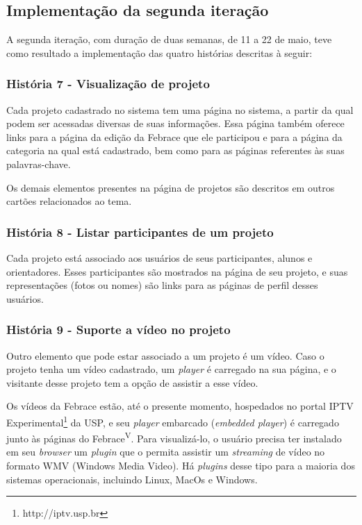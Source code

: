   \subsection{Implementação da segunda iteração}
    A segunda iteração, com duração de duas semanas, de 11 a 22 de maio, teve como resultado a implementação das quatro histórias descritas à seguir:

    \subsubsection{História 7 - Visualização de projeto}
      Cada projeto cadastrado no sistema tem uma página no sistema, a partir da qual podem ser acessadas diversas de suas informações. Essa página também oferece links para a página da edição da Febrace que ele participou e para a página da categoria na qual está cadastrado, bem como para as páginas referentes às suas palavras-chave.

      Os demais elementos presentes na página de projetos são descritos em outros cartões relacionados ao tema.

    \subsubsection{História 8 - Listar participantes de um projeto}
      Cada projeto está associado aos usuários de seus participantes, alunos e orientadores. Esses participantes são mostrados na página de seu projeto, e suas representações (fotos ou nomes) são links para as páginas de perfil desses usuários.

    \subsubsection{História 9 - Suporte a vídeo no projeto}
      Outro elemento que pode estar associado a um projeto é um vídeo. Caso o projeto tenha um vídeo cadastrado, um \textit{player} é carregado na sua página, e o visitante desse projeto tem a opção de assistir a esse vídeo.

      Os vídeos da Febrace estão, até o presente momento, hospedados no portal IPTV Experimental\footnote{http://iptv.usp.br} da USP, e seu \textit{player} embarcado (\textit{embedded player}) é carregado junto às páginas do Febrace\textsuperscript{V}. Para visualizá-lo, o usuário precisa ter instalado em seu \textit{browser} um \textit{plugin} que o permita assistir um \textit{streaming} de vídeo no formato WMV (Windows Media Video). Há \textit{plugins} desse tipo para a maioria dos sistemas operacionais, incluindo Linux, MacOs e Windows.

